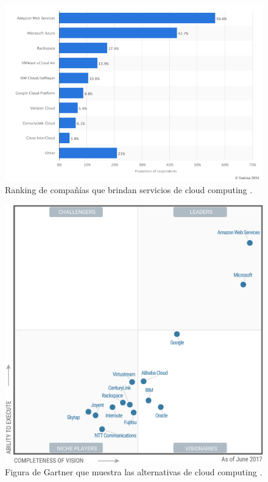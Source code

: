 \begin{figure}[H]
\centering
\includegraphics[width=125mm,scale=1]{Capitulos/PropuestadeSolucion/Imagenes/rank_cloud}
\caption{Ranking de compañías que brindan servicios de cloud computing \citep{statista_ranking}.}
  \label{graph_cloud}
\end{figure}

\begin{figure}[H]
\centering
\includegraphics[scale=0.5]{Capitulos/PropuestadeSolucion/Imagenes/gartner_cloud}
\caption{Figura de Gartner que muestra las alternativas de cloud computing \citep{gartner_webpage}.}
  \label{gartner_cloud}
\end{figure}

